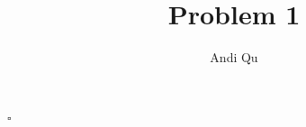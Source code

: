 \documentclass[11pt]{scrartcl}
\title{Problem 1}
\author{Andi Qu}
\newcommand*{\QED}{\hfill\ensuremath{\square}}%
\begin{document}
\maketitle



\QED
\end{document}
